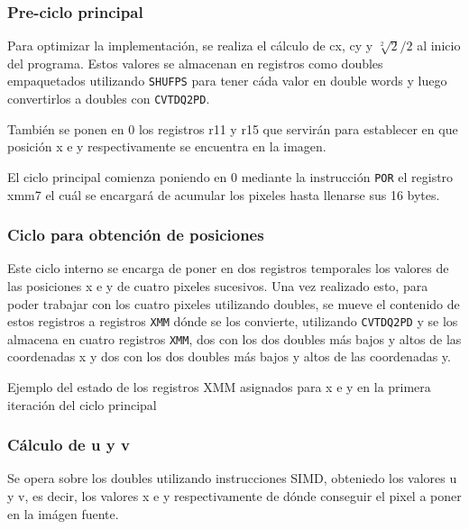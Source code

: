 \subsubsection{Pre-ciclo principal}
Para optimizar la implementación, se realiza el cálculo de cx, cy y $\sqrt[2]{2}/2$ al inicio del programa. Estos valores se almacenan en registros como doubles empaquetados utilizando \texttt{SHUFPS} para tener cáda valor en double words y luego convertirlos a doubles con \texttt{CVTDQ2PD}.

También se ponen en 0 los registros r11 y r15 que servirán para establecer en que posición x e y respectivamente se encuentra en la imagen.

El ciclo principal comienza poniendo en 0 mediante la instrucción \texttt{POR} el registro xmm7 el cuál se encargará de acumular los pixeles hasta llenarse sus 16 bytes.

\subsubsection{Ciclo para obtención de posiciones}
Este ciclo interno se encarga de poner en dos registros temporales los valores de las posiciones x e y de cuatro pixeles sucesivos. Una vez realizado esto, para poder trabajar con los cuatro pixeles utilizando doubles, se mueve el contenido de estos registros a registros \texttt{XMM} dónde se los convierte, utilizando \texttt{CVTDQ2PD} y se los almacena en cuatro registros \texttt{XMM}, dos con los dos doubles más bajos y altos de las coordenadas x y dos con los dos doubles más bajos y altos de las coordenadas y.

\begin{center}
\end{center}
Ejemplo del estado de los registros XMM asignados para x e y en la primera iteración del ciclo principal

\subsubsection{Cálculo de u y v}
Se opera sobre los doubles utilizando instrucciones SIMD, obteniedo los valores u y v, es decir, los valores x e y respectivamente de dónde conseguir el pixel a poner en la imágen fuente.

